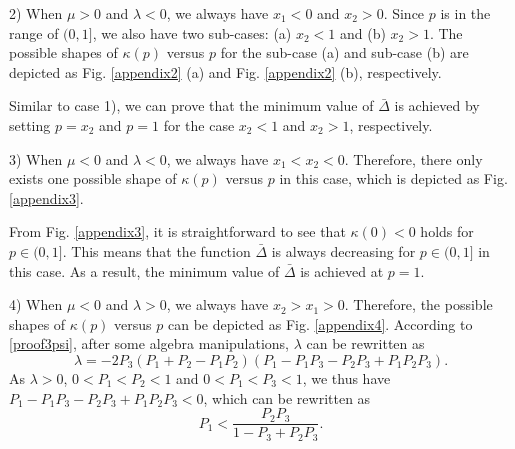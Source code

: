 \documentclass{IEEEtran}
\begin{document}
\begin{appendices}



2) When $\mu>0$ and $\lambda<0$, we always have $x_{1}<0$ and $x_{2}>0$. Since $p$ is in the range of $(0,1]$, we also have two sub-cases: (a) $x_{2}<1$ and (b) $x_{2}>1$. The possible shapes of $\kappa(p)$ versus $p$ for the sub-case (a) and sub-case (b) are depicted as Fig. \ref{appendix2} (a) and Fig. \ref{appendix2} (b), respectively. 

Similar to case 1), we can prove that the minimum value of $\bar\Delta$ is achieved by setting $p=x_{2}$ and $p=1$ for the case $x_{2}<1$ and $x_{2}>1$, respectively.



3) When $\mu<0$ and $\lambda<0$, we always have $x_{1}<x_{2}<0$. Therefore, there only exists one possible shape of $\kappa(p)$ versus $p$ in this case, which is depicted as Fig. \ref{appendix3}. 

From Fig. \ref{appendix3}, it is straightforward to see that $\kappa(0)<0$ holds for $p\in (0, 1]$. This means that the function $\bar\Delta$ is always decreasing for $p\in (0, 1]$ in this case. As a result, the minimum value of $\bar\Delta$ is achieved at $p=1$.



4) When $\mu<0$ and $\lambda>0$, we always have $x_{2}>x_{1}>0$. Therefore, the possible shapes of $\kappa(p)$ versus $p$ can be depicted as Fig. \ref{appendix4}. According to \eqref{proof3psi}, after some algebra manipulations, $\lambda$ can be rewritten as 
\begin{equation}
\lambda\!=-2P_{3}(P_{1}\!+\!P_{2}\!-\!P_{1}P_{2})(P_{1}\!-\!P_{1}P_{3}\!-\!P_{2}P_{3}\!+\!P_{1}P_{2}P_{3}).
\end{equation}
As $\lambda>0$, $0<P_{1}<P_{2}<1$ and $0<P_{1}<P_{3}<1$, we thus have $P_{1}-P_{1}P_{3}-P_{2}P_{3}+P_{1}P_{2}P_{3}<0$, which can be rewritten as
\begin{equation}\label{proof3P1}
P_{1}<\frac{P_{2}P_{3}}{1-P_{3}+P_{2}P_{3}}. 
\end{equation}


\end{appendices}
\end{document}
